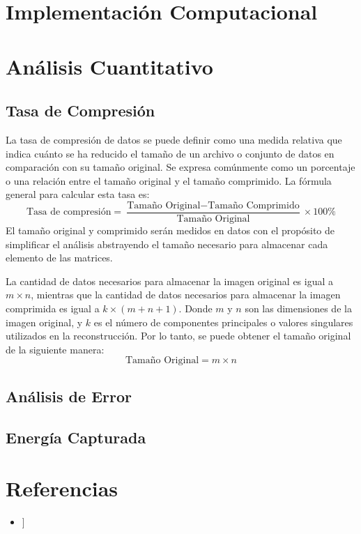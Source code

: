 \documentclass[12pt]{article}
\begin{document}
    \newpage

    \section{Implementación Computacional}


    \section{Análisis Cuantitativo}
        \subsection{Tasa de Compresión}
            La tasa de compresión de datos se puede definir como una medida relativa que indica cuánto se ha reducido el tamaño de un archivo o conjunto de datos en comparación con su tamaño original. Se expresa comúnmente como un porcentaje o una relación entre el tamaño original y el tamaño comprimido. La fórmula general para calcular esta tasa es:
            \[
                \text{Tasa de compresión} = \frac{\text{Tamaño Original} - \text{Tamaño Comprimido}}{\text{Tamaño Original}} \times 100\%
            \]
            El tamaño original y comprimido serán medidos en datos con el propósito de simplificar el análisis abstrayendo el tamaño necesario para almacenar cada elemento de las matrices.

            La cantidad de datos necesarios para almacenar la imagen original es igual a $m \times n$, mientras que la cantidad de datos necesarios para almacenar la imagen comprimida es igual a $k \times (m + n + 1)$. Donde $m$ y $n$ son las dimensiones de la imagen original, y $k$ es el número de componentes principales o valores singulares utilizados en la reconstrucción. Por lo tanto, se puede obtener el tamaño original de la siguiente manera:
            \[
                \text{Tamaño Original} = m \times n
            \]



        \subsection{Análisis de Error}

        \subsection{Energía Capturada}

    \section*{Referencias}
        \begin{itemize}
            \item[[1]] 
        \end{itemize}
\end{document}
